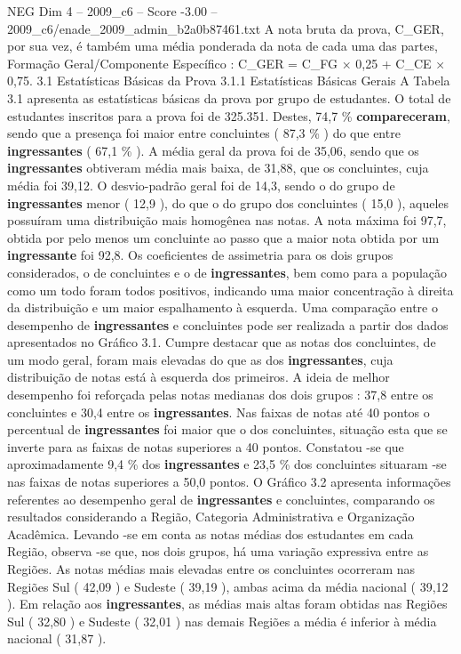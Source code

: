 \begin{textsample}{NEG Dim 4 – 2009\_c6 – Score -3.00 – 2009\_c6/enade\_2009\_admin\_b2a0b87461.txt}
A nota bruta da prova, C\_GER, por sua vez, é também uma média ponderada da nota de cada uma das partes, Formação Geral/Componente Específico : C\_GER = C\_FG × 0,25 + C\_CE × 0,75. 3.1 Estatísticas Básicas da Prova 3.1.1 Estatísticas Básicas Gerais A Tabela 3.1 apresenta as estatísticas básicas da prova por grupo de estudantes.
O total de estudantes inscritos para a prova foi de 325.351.
Destes, 74,7 \% \textbf{compareceram}, sendo que a presença foi maior entre concluintes ( 87,3 \% ) do que entre \textbf{ingressantes} ( 67,1 \% ).
A média geral da prova foi de 35,06, sendo que os \textbf{ingressantes} obtiveram média mais baixa, de 31,88, que os concluintes, cuja média foi 39,12.
O desvio-padrão geral foi de 14,3, sendo o do grupo de \textbf{ingressantes} menor ( 12,9 ), do que o do grupo dos concluintes ( 15,0 ), aqueles possuíram uma distribuição mais homogênea nas notas.
A nota máxima foi 97,7, obtida por pelo menos um concluinte ao passo que a maior nota obtida por um \textbf{ingressante} foi 92,8.
Os coeficientes de assimetria para os dois grupos considerados, o de concluintes e o de \textbf{ingressantes}, bem como para a população como um todo foram todos positivos, indicando uma maior concentração à direita da distribuição e um maior espalhamento à esquerda.
Uma comparação entre o desempenho de \textbf{ingressantes} e concluintes pode ser realizada a partir dos dados apresentados no Gráfico 3.1.
Cumpre destacar que as notas dos concluintes, de um modo geral, foram mais elevadas do que as dos \textbf{ingressantes}, cuja distribuição de notas está à esquerda dos primeiros.
A ideia de melhor desempenho foi reforçada pelas notas medianas dos dois grupos : 37,8 entre os concluintes e 30,4 entre os \textbf{ingressantes}.
Nas faixas de notas até 40 pontos o percentual de \textbf{ingressantes} foi maior que o dos concluintes, situação esta que se inverte para as faixas de notas superiores a 40 pontos.
Constatou -se que aproximadamente 9,4 \% dos \textbf{ingressantes} e 23,5 \% dos concluintes situaram -se nas faixas de notas superiores a 50,0 pontos.
O Gráfico 3.2 apresenta informações referentes ao desempenho geral de \textbf{ingressantes} e concluintes, comparando os resultados considerando a Região, Categoria Administrativa e Organização Acadêmica.
Levando -se em conta as notas médias dos estudantes em cada Região, observa -se que, nos dois grupos, há uma variação expressiva entre as Regiões.
As notas médias mais elevadas entre os concluintes ocorreram nas Regiões Sul ( 42,09 ) e Sudeste ( 39,19 ), ambas acima da média nacional ( 39,12 ).
Em relação aos \textbf{ingressantes}, as médias mais altas foram obtidas nas Regiões Sul ( 32,80 ) e Sudeste ( 32,01 ) nas demais Regiões a média é inferior à média nacional ( 31,87 ).

\end{textsample}
